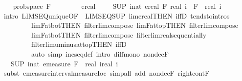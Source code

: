 \documentclass[leqno]{article}
\theoremstyle{definition}
\begin{document}
\begin{isabellebody}
\ \ \isamarkupfalse%
\ prob{\isacharunderscore}space\ {\isacharquery}F\isanewline
\ \ \isamarkupfalse%
\isanewline
\ \ \ \ \isamarkupfalse%
\ {\isachardoublequoteopen}ereal\ {\isacharparenleft}{}\ {\isacharminus}\ {}{\isacharparenright}\ {\isacharequal}\ {\isacharparenleft}SUP\ i{\isacharcolon}{\isacharcolon}nat{\isachardot}\ ereal\ {\isacharparenleft}F\ {\isacharparenleft}real\ i{\isacharparenright}\ {\isacharminus}\ F\ {\isacharparenleft}{\isacharminus}\ real\ i{\isacharparenright}{\isacharparenright}{\isacharparenright}{\isachardoublequoteclose}\isanewline
\ \ \ \ \ \ \isamarkupfalse%
\ {\isacharparenleft}intro\ LIMSEQ{\isacharunderscore}unique{\isacharbrackleft}OF\ {\isacharunderscore}\ LIMSEQ{\isacharunderscore}SUP{\isacharbrackright}\ lim{\isacharunderscore}ereal{\isacharbrackleft}THEN\ iffD{}{\isacharbrackright}\ tendsto{\isacharunderscore}intros\isanewline
\ \ \ \ \ \ \ \ \ lim{\isacharunderscore}F{\isacharunderscore}at{\isacharunderscore}bot{\isacharbrackleft}THEN\ filterlim{\isacharunderscore}compose{\isacharbrackright}\ lim{\isacharunderscore}F{\isacharunderscore}at{\isacharunderscore}top{\isacharbrackleft}THEN\ filterlim{\isacharunderscore}compose{\isacharbrackright}\isanewline
\ \ \ \ \ \ \ \ \ lim{\isacharunderscore}F{\isacharunderscore}at{\isacharunderscore}bot{\isacharbrackleft}THEN\ filterlim{\isacharunderscore}compose{\isacharbrackright}\ filterlim{\isacharunderscore}real{\isacharunderscore}sequentially\isanewline
\ \ \ \ \ \ \ \ \ filterlim{\isacharunderscore}uminus{\isacharunderscore}at{\isacharunderscore}top{\isacharbrackleft}THEN\ iffD{}{\isacharbrackright}{\isacharparenright}\isanewline
\ \ \ \ \ \ \ \ \ {\isacharparenleft}auto\ simp{\isacharcolon}\ incseq{\isacharunderscore}def\ intro{\isacharbang}{\isacharcolon}\ diff{\isacharunderscore}mono\ nondecF{\isacharparenright}\isanewline
\ \ \ \ \isamarkupfalse%
\ \isamarkupfalse%
\ {\isachardoublequoteopen}{\isasymdots}\ {\isacharequal}\ {\isacharparenleft}SUP\ i{\isacharcolon}{\isacharcolon}nat{\isachardot}\ emeasure\ {\isacharquery}F\ {\isacharbraceleft}{\isacharminus}\ real\ i{\isacharless}{\isachardot}{\isachardot}real\ i{\isacharbraceright}{\isacharparenright}{\isachardoublequoteclose}\isanewline
\ \ \ \ \ \ \isamarkupfalse%
\ {\isacharparenleft}subst\ emeasure{\isacharunderscore}interval{\isacharunderscore}measure{\isacharunderscore}Ioc{\isacharparenright}\ {\isacharparenleft}simp{\isacharunderscore}all\ add{\isacharcolon}\ nondecF\ right{\isacharunderscore}cont{\isacharunderscore}F{\isacharparenright}\isanewline

\end{isabellebody}
\end{document}
